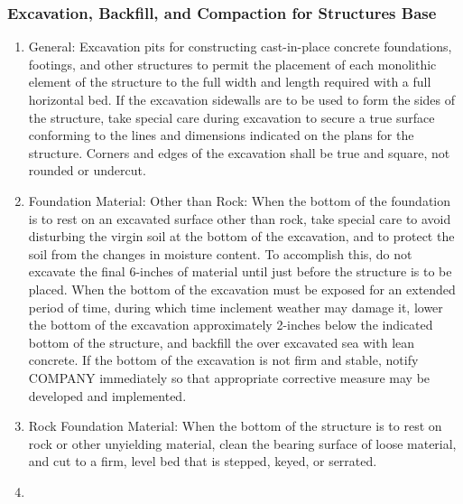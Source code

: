 \documentclass{article}%
\begin{document}
\subsubsection{Excavation, Backfill, and Compaction for Structures Base}%
\label{ssubsec:Excavation,Backfill,andCompactionforStructuresBase}%
\begin{enumerate}[label=\alph*),start=1]%
\item%
General: Excavation pits for constructing cast{-}in{-}place concrete foundations, footings, and other structures to permit the placement of each monolithic element of the structure to the full width and length required with a full horizontal bed. If the excavation sidewalls are to be used to form the sides of the structure, take special care during excavation to secure a true surface conforming to the lines and dimensions indicated on the plans for the structure. Corners and edges of the excavation shall be true and square, not rounded or undercut.%
\item%
Foundation Material: Other than Rock: When the bottom of the foundation is to rest on an excavated surface other than rock, take special care to avoid disturbing the virgin soil at the bottom of the excavation, and to protect the soil from the changes in moisture content. To accomplish this, do not excavate the final 6{-}inches of material until just before the structure is to be placed. When the bottom of the excavation must be exposed for an extended period of time, during which time inclement weather may damage it, lower the bottom of the excavation approximately 2{-}inches below the indicated bottom of the structure, and backfill the over excavated sea with lean concrete. If the bottom of the excavation is not firm and stable, notify COMPANY immediately so that appropriate corrective measure may be developed and implemented.%
\item%
Rock Foundation Material: When the bottom of the structure is to rest on rock or other unyielding material, clean the bearing surface of loose material, and cut to a firm, level bed that is stepped, keyed, or serrated.%
\item%

\end{enumerate}
\end{document}
